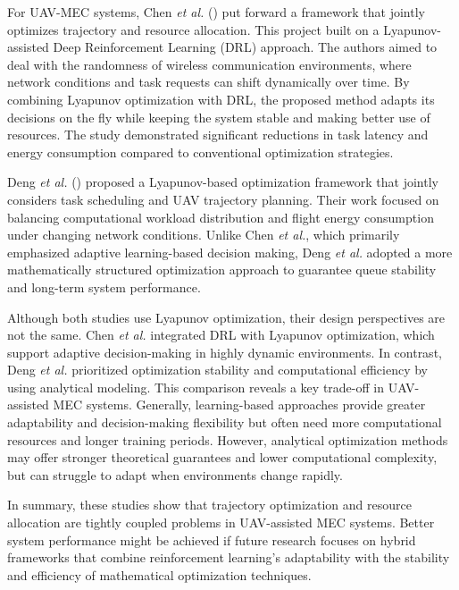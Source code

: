 \documentclass[a4paper, 12pt]{article}
\begin{document}
For UAV-MEC systems, Chen \textit{et al.} (\cite{Chen2025TSC}) put forward a framework that jointly optimizes trajectory and resource allocation. This project built on a Lyapunov-assisted Deep Reinforcement Learning (DRL) approach. The authors aimed to deal with the randomness of wireless communication environments, where network conditions and task requests can shift dynamically over time. By combining Lyapunov optimization with DRL, the proposed method adapts its decisions on the fly while keeping the system stable and making better use of resources. The study demonstrated significant reductions in task latency and energy consumption compared to conventional optimization strategies.

Deng \textit{et al.} (\cite{Deng2025}) proposed a Lyapunov-based optimization framework that jointly considers task scheduling and UAV trajectory planning. Their work focused on balancing computational workload distribution and flight energy consumption under changing network conditions. Unlike Chen \textit{et al.}, which primarily emphasized adaptive learning-based decision making, Deng \textit{et al.} adopted a more mathematically structured optimization approach to guarantee queue stability and long-term system performance.

Although both studies use Lyapunov optimization, their design perspectives are not the same. Chen \textit{et al.} integrated DRL with Lyapunov optimization, which support adaptive decision-making in highly dynamic environments. In contrast, Deng \textit{et al.} prioritized optimization stability and computational efficiency by using analytical modeling. This comparison reveals a key trade-off in UAV-assisted MEC systems. Generally, learning-based approaches provide greater adaptability and decision-making flexibility but often need more computational resources and longer training periods. However,
analytical optimization methods may offer stronger theoretical guarantees and lower computational complexity, but can struggle to adapt when environments change rapidly.

In summary, these studies show that trajectory optimization and resource allocation are tightly coupled problems in UAV-assisted MEC systems. Better system performance might be achieved if future research focuses on hybrid frameworks that combine reinforcement learning's adaptability with the stability and efficiency of mathematical optimization techniques.
\end{document}
